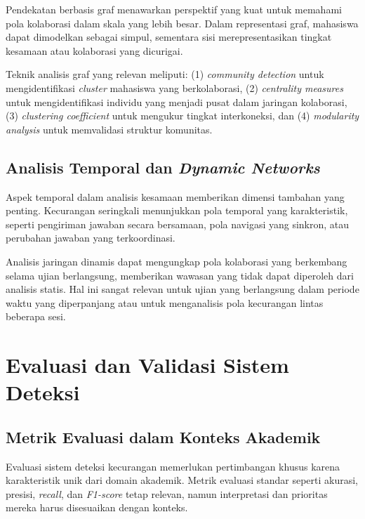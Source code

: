 Pendekatan berbasis graf menawarkan perspektif yang kuat untuk memahami pola kolaborasi dalam skala yang lebih besar. Dalam representasi graf, mahasiswa dapat dimodelkan sebagai simpul, sementara sisi merepresentasikan tingkat kesamaan atau kolaborasi yang dicurigai.

Teknik analisis graf yang relevan meliputi: (1) \textit{community detection} untuk mengidentifikasi \textit{cluster} mahasiswa yang berkolaborasi, (2) \textit{centrality measures} untuk mengidentifikasi individu yang menjadi pusat dalam jaringan kolaborasi, (3) \textit{clustering coefficient} untuk mengukur tingkat interkoneksi, dan (4) \textit{modularity analysis} untuk memvalidasi struktur komunitas.

\subsection{Analisis Temporal dan \textit{Dynamic Networks}}

Aspek temporal dalam analisis kesamaan memberikan dimensi tambahan yang penting. Kecurangan seringkali menunjukkan pola temporal yang karakteristik, seperti pengiriman jawaban secara bersamaan, pola navigasi yang sinkron, atau perubahan jawaban yang terkoordinasi.

Analisis jaringan dinamis dapat mengungkap pola kolaborasi yang berkembang selama ujian berlangsung, memberikan wawasan yang tidak dapat diperoleh dari analisis statis. Hal ini sangat relevan untuk ujian yang berlangsung dalam periode waktu yang diperpanjang atau untuk menganalisis pola kecurangan lintas beberapa sesi.

\section{Evaluasi dan Validasi Sistem Deteksi}
\label{sec:evaluationValidation}

\subsection{Metrik Evaluasi dalam Konteks Akademik}

Evaluasi sistem deteksi kecurangan memerlukan pertimbangan khusus karena karakteristik unik dari domain akademik. Metrik evaluasi standar seperti akurasi, presisi, \textit{recall}, dan \textit{F1-score} tetap relevan, namun interpretasi dan prioritas mereka harus disesuaikan dengan konteks.

